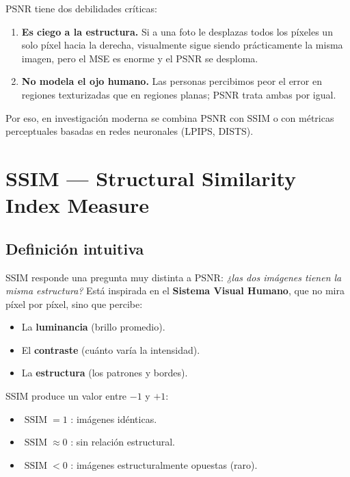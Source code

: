 \documentclass[11pt,a4paper]{article}
\begin{document}
PSNR tiene dos debilidades críticas:

\begin{enumerate}
    \item \textbf{Es ciego a la estructura.} Si a una foto le desplazas todos los
          píxeles un solo píxel hacia la derecha, visualmente sigue siendo
          prácticamente la misma imagen, pero el MSE es enorme y el PSNR se
          desploma.
    \item \textbf{No modela el ojo humano.} Las personas percibimos peor el error
          en regiones texturizadas que en regiones planas; PSNR trata ambas por
          igual.
\end{enumerate}

Por eso, en investigación moderna se combina PSNR con SSIM o con métricas
perceptuales basadas en redes neuronales (LPIPS, DISTS).

\section{\textcolor{verdeSSIM}{SSIM} — Structural Similarity Index Measure}

\subsection{Definición intuitiva}

SSIM responde una pregunta muy distinta a PSNR: \emph{¿las dos imágenes tienen
la misma estructura?} Está inspirada en el \textbf{Sistema Visual Humano}, que
no mira píxel por píxel, sino que percibe:

\begin{itemize}
    \item La \textbf{luminancia} (brillo promedio).
    \item El \textbf{contraste} (cuánto varía la intensidad).
    \item La \textbf{estructura} (los patrones y bordes).
\end{itemize}

SSIM produce un valor entre \(-1\) y \(+1\):
\begin{itemize}
    \item \(\operatorname{SSIM} = 1\) : imágenes idénticas.
    \item \(\operatorname{SSIM} \approx 0\) : sin relación estructural.
    \item \(\operatorname{SSIM} < 0\) : imágenes estructuralmente opuestas (raro).
\end{itemize}
\end{document}
